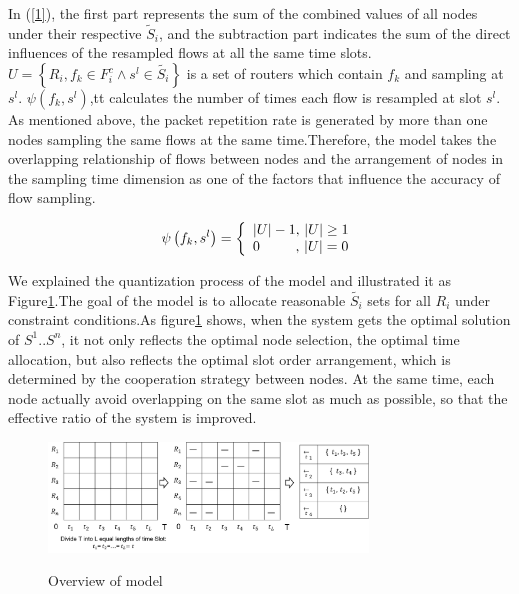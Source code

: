 \documentclass[conference]{IEEEtran}
\begin{document}
In (\ref{1}), the first part represents the sum of the combined values of all nodes under their respective $\widetilde{S}_i$, and the subtraction part indicates the sum of the direct influences of the resampled flows at all the same time slots. $U = \left\{ {{R_i},{f_k} \in F_i^c \wedge {s^l} \in \widetilde {{S_i}}} \right\}$ is a set of routers which contain $f_k$ and sampling at $s^l$.  $\psi ({{f}_{k}},{{s}^{l}})$,tt calculates the number of times each flow is resampled at slot $s^l$. As mentioned above, the packet repetition rate is generated by more than one nodes sampling the same flows at the same time.Therefore, the model takes the overlapping relationship of flows between nodes and the arrangement of nodes in the sampling time dimension as one of the factors that influence the accuracy of flow sampling.  %

\begin{equation}
\psi \left( {{f_k},{s^l}} \right) = \left\{ \begin{array}{l}
\left| U \right| - 1,{\rm{    }}\left| U \right| \ge 1\\
{\rm{   }}0\quad \quad \; \; ,\, \left| U \right| = 0
\end{array} \right.\label{5}
\end{equation}

We explained the quantization process of the model and illustrated it as Figure\ref{fig_1_model}.The goal of the model is to allocate reasonable $\widetilde{{{S}_{i}}}$ sets for all $R_i$ under constraint conditions.As  figure\ref{fig_1_model} shows, when the system gets the optimal solution of $S ^ 1..S ^ n $, it not only reflects the optimal node selection, the optimal time allocation, but also reflects the optimal slot order arrangement, which is determined by the cooperation strategy between nodes. At the same time, each node actually avoid overlapping on the same slot as much as possible, so that the effective ratio of the system is improved.

 

\begin{figure}[!!!!!!!!!!!!!!hhhhhhhhhht]
\centering

\includegraphics[width=8.5cm]{images/slot_num_order.png}
\label{fig_1_slot}

\caption{Overview of model}
\label{fig_1_model}
\end{figure}
\end{document}
